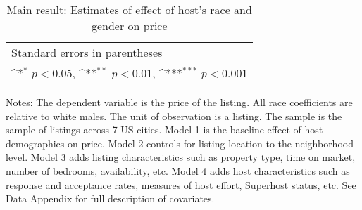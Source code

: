 \documentclass[11pt, oneside]{article}
\begin{document}

\newpage


\newpage


\newpage


\newpage

\begin{table}[htbp]
	\def\sym#1{\ifmmode^{#1}\else\(^{#1}\)\fi}
	\caption{Main result: Estimates of effect of host’s race and gender on price}
	\begin{tabular}{l*{5}{c}}

	\multicolumn{6}{l}{\footnotesize Standard errors in parentheses}\\
	\multicolumn{6}{l}{\footnotesize \sym{*} \(p<0.05\), \sym{**} \(p<0.01\), \sym{***} \(p<0.001\)}\\
	\end{tabular}

	\begin{tablenotes}
	
	\item Notes: The dependent variable is the price of the listing. All race coefficients are relative to white males. The unit of observation is a listing. The sample is the sample of listings across 7 US cities. Model 1 is the baseline effect of host demographics on price. Model 2 controls for listing location to the neighborhood level. Model 3 adds listing characteristics such as property type, time on market, number of bedrooms, availability, etc. Model 4 adds host characteristics such as response and acceptance rates, measures of host effort, Superhost status, etc. See Data Appendix for full description of covariates.  
\end{tablenotes}
\end{table}
\end{document}

